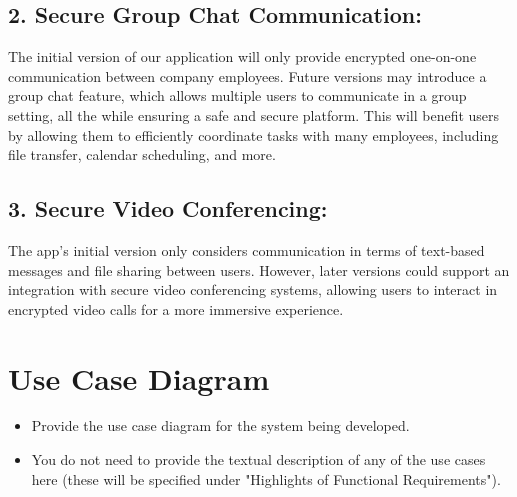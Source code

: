 \documentclass[]{article}
\begin{document}
\subsection*{2. Secure Group Chat Communication:}
The initial version of our application will only provide encrypted one-on-one communication between company employees. Future versions may introduce a group chat feature, which allows multiple users to communicate in a group setting, all the while ensuring a safe and secure platform. This will benefit users by allowing them to efficiently coordinate tasks with many employees, including file transfer, calendar scheduling, and more.

\subsection*{3. Secure Video Conferencing:}
The app’s initial version only considers communication in terms of text-based messages and file sharing between users. However, later versions could support an integration with secure video conferencing systems, allowing users to interact in encrypted video calls for a more immersive experience.

\section{Use Case Diagram}
\label{sec:use_case_diagram}
\begin{itemize}
	\item Provide the use case diagram for the system being developed.
	\item You do not need to provide the textual description of any of the use cases here (these will be specified under "Highlights of Functional Requirements").
\end{itemize}

%
%
%
\end{document}
